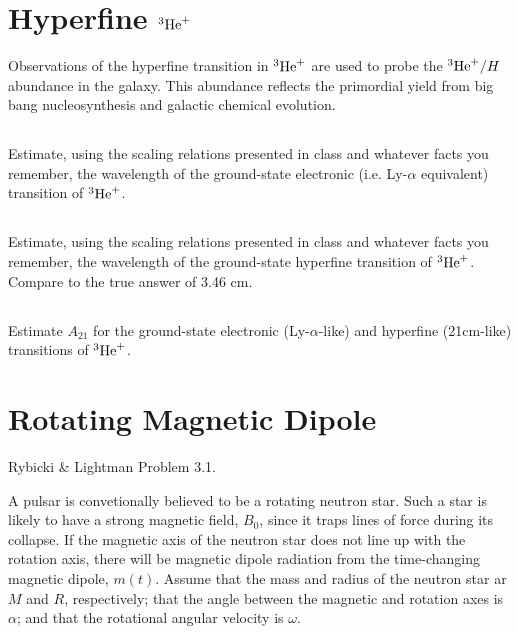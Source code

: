 \documentclass[11pt]{article}
\begin{document}
\def\He{{^3{\rm He}^+}}
\section{Hyperfine $\He$}
\vspace{-8pt}

Observations of the hyperfine transition in $\He$ are used to probe the $\He/H$ abundance
in the galaxy.  This abundance reflects the primordial yield from big bang nucleosynthesis
and galactic chemical evolution.

\subsection{}
\vspace{-8pt}
Estimate, using the scaling relations presented in class and whatever facts you
remember, the wavelength of the ground-state electronic (i.e. Ly-$\alpha$ equivalent) transition of $\He$.

\subsection{}
\vspace{-8pt}
Estimate, using the scaling relations presented in class and whatever facts you
remember, the wavelength of the ground-state hyperfine transition of $\He$.  Compare
to the true answer of 3.46 cm.

\subsection{}
\vspace{-8pt}
Estimate $A_{21}$ for the ground-state electronic (Ly-$\alpha$-like) and hyperfine (21cm-like) transitions of $\He$.

\section{Rotating Magnetic Dipole}
\vspace{-8pt}

Rybicki \& Lightman Problem 3.1.

A pulsar is convetionally believed to be a rotating neutron star.  Such
a star is likely to have a strong magnetic field, $B_0$, since it traps
lines of force during its collapse.  If the magnetic axis of the neutron
star does not line up with the rotation axis, there will be magnetic dipole
radiation from the time-changing magnetic dipole, $m(t)$.  Assume that the mass
and radius of the neutron star ar $M$ and $R$, respectively; that the angle
between the magnetic and rotation axes is $\alpha$; and that the rotational
angular velocity is $\omega$.
\end{document}
